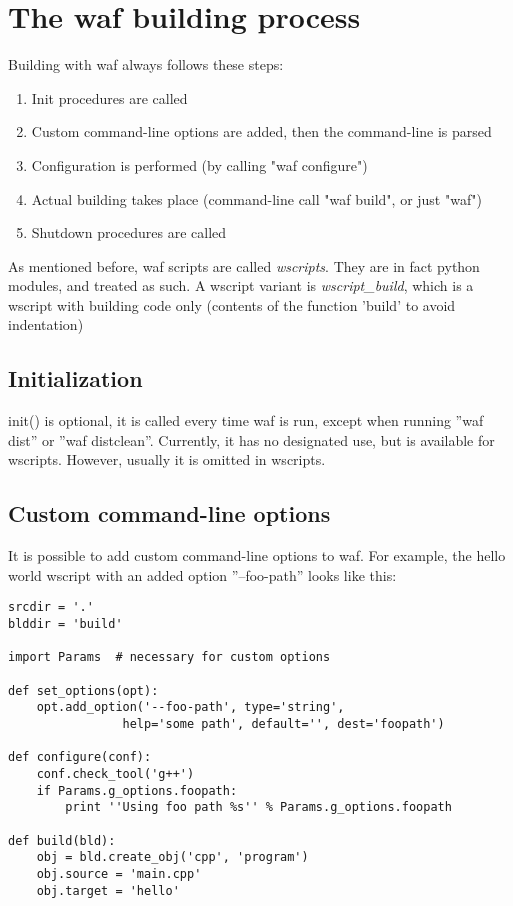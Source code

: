 \documentclass[a4,10pt]{article}
\begin{document}
\section{The waf building process}

Building with waf always follows these steps:

\begin{enumerate}
\item Init procedures are called
\item Custom command-line options are added, then the command-line is parsed
\item Configuration is performed (by calling "waf configure")
\item Actual building takes place (command-line call "waf build", or just "waf")
\item Shutdown procedures are called
\end{enumerate}

As mentioned before, waf scripts are called \emph{wscripts}. They are in fact python modules, and treated as such. A wscript variant is \emph{wscript\_build}, which is a wscript with building code only (contents of the function 'build' to avoid indentation)

\subsection{Initialization}
init() is optional, it is called every time waf is run, except when running ''waf dist'' or ''waf distclean''. Currently, it has no designated use, but is available for wscripts. However, usually it is omitted in wscripts.

\subsection{Custom command-line options}
It is possible to add custom command-line options to waf. For example, the hello world wscript with an added option ''--foo-path'' looks like this:

\begin{center}
	\begin{lstlisting}[caption=\footnotesize The hello world wscript with the custom option added]
srcdir = '.'
blddir = 'build'

import Params  # necessary for custom options

def set_options(opt):
	opt.add_option('--foo-path', type='string',
				help='some path', default='', dest='foopath')

def configure(conf):
    conf.check_tool('g++')
	if Params.g_options.foopath:
		print ''Using foo path %s'' % Params.g_options.foopath

def build(bld):
    obj = bld.create_obj('cpp', 'program')
    obj.source = 'main.cpp'
    obj.target = 'hello'
	\end{lstlisting}
\end{center}
\end{document}
